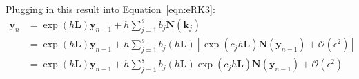 \documentclass{article}
\newcommand{\eps}{\epsilon}
\newcommand{\bb}[1]{\mathbf{#1}}
\theoremstyle{definition}
\begin{document}
Plugging in this result into Equation~\ref{eqn:eRK3}:
\begin{align*}
\bb{y}_n &= \exp(h\bb{L})\bb{y}_{n-1} + h\sum_{j=1}^s b_j\bb{N}(\bb{k}_j) \\
&= \exp(h\bb{L})\bb{y}_{n-1} + h\sum_{j=1}^s b_j(h\bb{L})[\exp(c_jh\bb{L})\bb{N}(\bb{y}_{n-1}) + \mathcal{O}(\eps^2)]\\
&= \exp(h\bb{L})\bb{y}_{n-1} + h\sum_{j=1}^s b_j(h\bb{L})\exp(c_jh\bb{L})\bb{N}(\bb{y}_{n-1}) + \mathcal{O}(\eps^2)\\
\end{align*}




\end{document}
